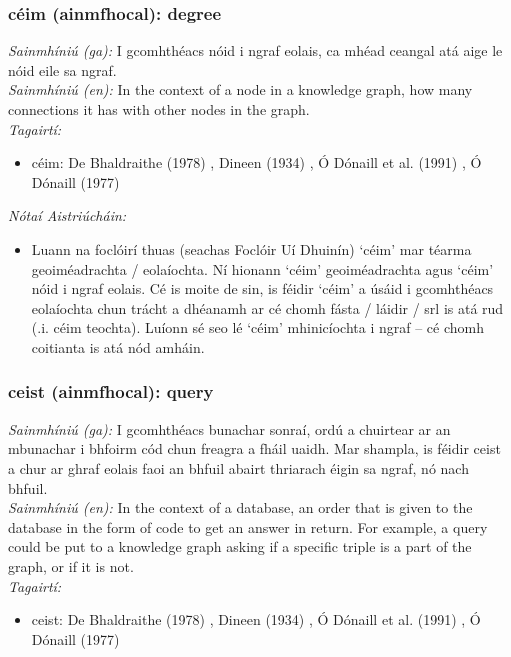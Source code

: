 \subsubsection*{céim (ainmfhocal): degree}
 \noindent \textit{Sainmhíniú (ga):} I gcomhthéacs nóid i ngraf eolais, ca mhéad ceangal atá aige le nóid eile sa ngraf.
\\
 \noindent \textit{Sainmhíniú (en):} In the context of a node in a knowledge graph, how many connections it has with other nodes in the graph.
\\
 \noindent \textit{Tagairtí:}
\begin{itemize}
	\item céim: De Bhaldraithe (1978) \cite{de-bhaldraithe}, Dineen (1934) \cite{dineen}, Ó Dónaill et al. (1991) \cite{focloir-beag}, Ó Dónaill (1977) \cite{odonaill}
\end{itemize}

 \noindent \textit{Nótaí Aistriúcháin:}
\begin{itemize}
	\item Luann na foclóirí thuas (seachas Foclóir Uí Dhuinín) `céim' mar téarma geoiméadrachta / eolaíochta. Ní hionann `céim' geoiméadrachta agus `céim' nóid i ngraf eolais. Cé is moite de sin, is féidir `céim' a úsáid i gcomhthéacs eolaíochta chun trácht a dhéanamh ar cé chomh fásta / láidir / srl is atá rud (.i. céim teochta). Luíonn sé seo lé `céim' mhinicíochta i ngraf -- cé chomh coitianta is atá nód amháin.
\end{itemize}


\subsubsection*{ceist (ainmfhocal): query}
 \noindent \textit{Sainmhíniú (ga):} I gcomhthéacs bunachar sonraí, ordú a chuirtear ar an mbunachar i bhfoirm cód chun freagra a fháil uaidh. Mar shampla, is féidir ceist a chur ar ghraf eolais faoi an bhfuil abairt thriarach éigin sa ngraf, nó nach bhfuil.
\\
 \noindent \textit{Sainmhíniú (en):} In the context of a database, an order that is given to the database in the form of code to get an answer in return. For example, a query could be put to a knowledge graph asking if a specific triple is a part of the graph, or if it is not.
\\
 \noindent \textit{Tagairtí:}
\begin{itemize}
	\item ceist: De Bhaldraithe (1978) \cite{de-bhaldraithe}, Dineen (1934) \cite{dineen}, Ó Dónaill et al. (1991) \cite{focloir-beag}, Ó Dónaill (1977) \cite{odonaill}
\end{itemize}

